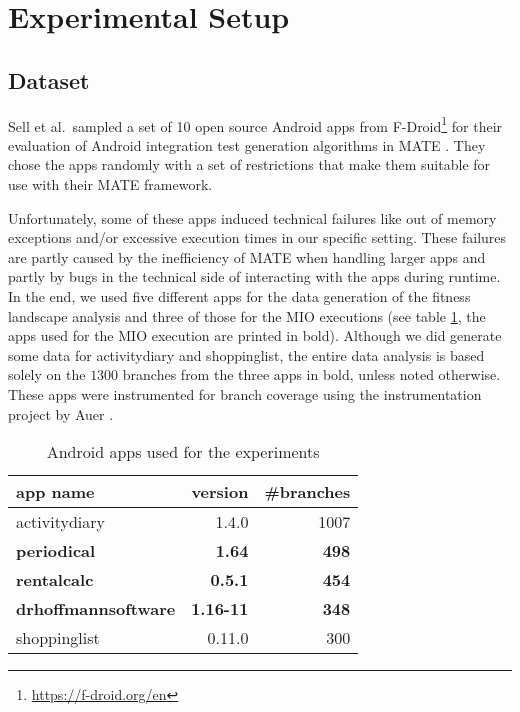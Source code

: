 \section{Experimental Setup}\label{sec:experimental_setup}

\subsection{Dataset}
Sell et al.~sampled a set of 10 open source Android apps from F-Droid\footnote{\href{https://f-droid.org/en}{https://f-droid.org/en}} for their evaluation of Android integration test generation algorithms in MATE \cite{sell2019empirical}. They chose the apps randomly with a set of restrictions that make them suitable for use with their MATE framework.

Unfortunately, some of these apps induced technical failures like out of memory exceptions and/or excessive execution times in our specific setting.
These failures are partly caused by the inefficiency of MATE when handling larger apps and partly by bugs in the technical side of interacting with the apps during runtime.
In the end, we used five different apps for the data generation of the fitness landscape analysis and three of those for the MIO executions (see table \ref{table:apps}, the apps used for the MIO execution are printed in bold).
Although we did generate some data for activitydiary and shoppinglist, the entire data analysis is based solely on the $1300$ branches from the three apps in bold, unless noted otherwise.
These apps were instrumented for branch coverage using the instrumentation project by Auer \cite{instrumentation}.

\begin{table}[h]
	\caption{Android apps used for the experiments}\label{table:apps}
	\begin{center}
		\begin{tabular}{lrr}\toprule
			app name & version & \#branches\\
			\midrule
			activitydiary & 1.4.0 & 1007\\
			\textbf{periodical} & \textbf{1.64} & \textbf{498}\\
			\textbf{rentalcalc} & \textbf{0.5.1} & \textbf{454}\\
			\textbf{drhoffmannsoftware} & \textbf{1.16-11} & \textbf{348}\\
			shoppinglist & 0.11.0 & 300\\
			\bottomrule
		\end{tabular}
	\end{center}
\end{table}

